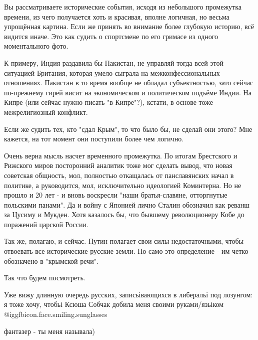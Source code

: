 \begin{itemize}

Вы рассматриваете исторические события, исходя из небольшого промежутка
времени, из чего получается хоть и красивая, вполне логичная, но весьма
упрощённая картина. Если же принять во внимание более глубокую историю, всё
видится иначе. Это как судить о спортсмене по его гримасе из одного
моментального фото.

К примеру, Индия раздавила бы Пакистан, не управляй тогда всей этой ситуацией
Британия, которая умело сыграла на межконфессиональных отношениях. Пакистан в
то время вообще не обладал субъектностью, зато сейчас по-прежнему гирей висит
на экономическом и политическом подъёме Индии. На Кипре (или сейчас нужно
писать "в Кипре"?), кстати, в основе тоже межрелигиозный конфликт.

Если же судить тех, кто "сдал Крым", то что было бы, не сделай они этого? Мне
кажется, на тот момент они поступили более чем логично.

\begin{itemize} %

Очень верна мысль насчет временного промежутка. По итогам Брестского и Рижского
миров посторонний аналитик тоже мог сделать вывод, что новая советская
общность, мол, полностью откащалась от панславянских начал в политике, а
руководится, мол, исключительно идеологией Коминтерна. Но не прошло и 20 лет -
и вновь воскресли "наши братья-славяне, отторгнутые польскими панами". Да и
войну с Японией лично Сталин обозначил как реванш за Цусиму и Мукден. Хотя
казалось бы, что бывшему революционеру Кобе до поражений царской России.

Так же, полагаю, и сейчас. Путин полагает свои силы недостаточными, чтобы
отвоевать все исторические русские земли. Но само это определение - им четко
обозначено в "крымской речи".

Так что будем посмотреть.

\end{itemize} %


Уже вижу длинную очередь русских, записьівающихся в либеральі под лозунгом: я
тоже хочу, чтобьі Ксюша Собчак добила меня своими руками/язьіком @igg{fbicon.face.smiling.sunglasses} 

\begin{itemize} %
фантазер - ты меня называла)
\end{itemize} %



\end{itemize}
